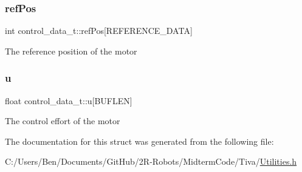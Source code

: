 \subsubsection{\texorpdfstring{ref\+Pos}{refPos}}
{\footnotesize\ttfamily int control\+\_\+data\+\_\+t\+::ref\+Pos\mbox{[}R\+E\+F\+E\+R\+E\+N\+C\+E\+\_\+\+D\+A\+TA\mbox{]}}

The reference position of the motor \mbox{\label{structcontrol__data__t_afaa78dec7226a62a09817e6ac67f8b3a}} 
\subsubsection{\texorpdfstring{u}{u}}
{\footnotesize\ttfamily float control\+\_\+data\+\_\+t\+::u\mbox{[}B\+U\+F\+L\+EN\mbox{]}}

The control effort of the motor 

The documentation for this struct was generated from the following file\+:\begin{DoxyCompactItemize}
\item 
C\+:/\+Users/\+Ben/\+Documents/\+Git\+Hub/2\+R-\/\+Robots/\+Midterm\+Code/\+Tiva/\mbox{\hyperlink{_utilities_8h}{Utilities.\+h}}\end{DoxyCompactItemize}
